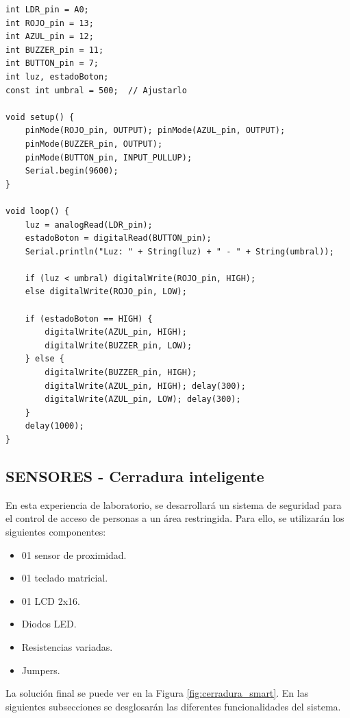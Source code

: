 \documentclass{article}
\begin{document}
\begin{lstlisting}[style=cppstyle, caption={Código en C++ para el sensor ambiental.}, label={code:sensor_ambiental}]
int LDR_pin = A0;
int ROJO_pin = 13;
int AZUL_pin = 12;
int BUZZER_pin = 11;
int BUTTON_pin = 7;
int luz, estadoBoton;
const int umbral = 500;  // Ajustarlo

void setup() {
    pinMode(ROJO_pin, OUTPUT); pinMode(AZUL_pin, OUTPUT);
    pinMode(BUZZER_pin, OUTPUT);
    pinMode(BUTTON_pin, INPUT_PULLUP);
    Serial.begin(9600);
}

void loop() {
    luz = analogRead(LDR_pin);
    estadoBoton = digitalRead(BUTTON_pin);
    Serial.println("Luz: " + String(luz) + " - " + String(umbral));
    
    if (luz < umbral) digitalWrite(ROJO_pin, HIGH);
    else digitalWrite(ROJO_pin, LOW);
    
    if (estadoBoton == HIGH) {
        digitalWrite(AZUL_pin, HIGH);
        digitalWrite(BUZZER_pin, LOW);
    } else {
        digitalWrite(BUZZER_pin, HIGH);
        digitalWrite(AZUL_pin, HIGH); delay(300);
        digitalWrite(AZUL_pin, LOW); delay(300);
    }
    delay(1000);
}    
\end{lstlisting}


\subsection{SENSORES - Cerradura inteligente}

En esta experiencia de laboratorio, se desarrollará un sistema de seguridad para el control de acceso de personas a un área restringida. Para ello, se utilizarán los siguientes componentes: 

\begin{itemize}
    \item 01 sensor de proximidad.
    \item 01 teclado matricial.
    \item 01 LCD 2x16.
    \item Diodos LED.
    \item Resistencias variadas.
    \item Jumpers.
\end{itemize}

La solución final se puede ver en la Figura \ref{fig:cerradura_smart}. En las siguientes subsecciones se desglosarán las diferentes funcionalidades del sistema.
\end{document}
